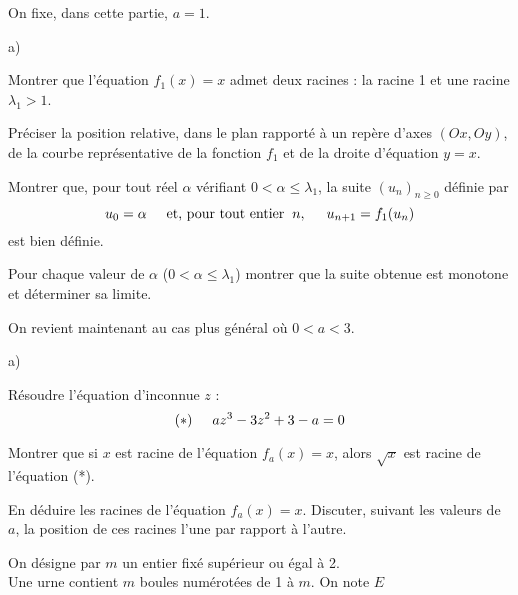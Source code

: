 \documentclass[11pt]{article}%
\begin{document}
\item
On fixe, dans cette partie, $a = 1$.
\begin{noliste}{a)}
 \setlength{\itemsep}{2mm}
\item
Montrer que l'équation $f_{1}(x) = x$ admet deux racines : la racine 1
et une racine $\lambda_{1} >1$.
\item
Préciser la position relative, dans le plan rapporté à un repère d'axes
$(Ox, Oy)$, de la courbe représentative de la fonction $f_{1}$ et de la
droite d'équation $y = x$.
\item
Montrer que, pour tout réel $\alpha$ vérifiant $0 < \alpha\leq
\lambda_{1}$, la suite $(u_{n})_{n\geq 0}$ définie par 
\[
u_{0} = \alpha \hspace{0.5cm} \textrm{et, pour tout
entier}\hspace{0.2cm} n,\hspace{0.5cm} u_{n + 1} = f_{1}(u_{n})
\]
est bien définie.
\item
Pour chaque valeur de $\alpha$ ($0 < \alpha\leq \lambda_{1}$) montrer
que la suite obtenue est monotone et déterminer sa limite.
\end{noliste}
On revient maintenant au cas plus général où $0<a<3$.
\begin{noliste}{a)}
 \setlength{\itemsep}{2mm}
\item
Résoudre l'équation d'inconnue $z$ :
\[
(*) \hspace{0.5cm} az^{3}-3z^{2} + 3-a = 0
\]
\item
Montrer que si $x$ est racine de l'équation $f_{a}(x) = x$, alors
$\sqrt{x}$ est racine de l'équation (*).
\item
En déduire les racines de l'équation $f_{a}(x) = x$. Discuter, suivant
les valeurs de $a$, la position de ces racines l'une par rapport à
l'autre.
\end{noliste}
On désigne par $m$ un entier fixé supérieur ou égal à 2.\\
Une urne contient $m$ boules numérotées de 1 à $m$. On note $E$
\end{document}
